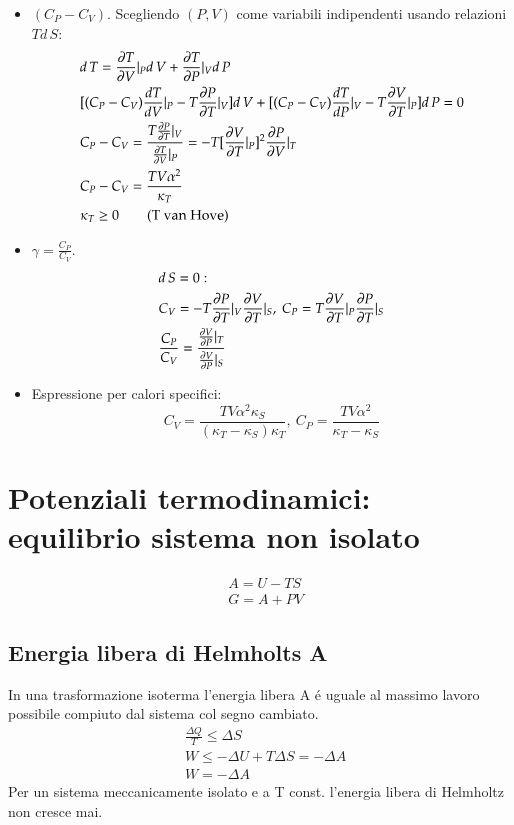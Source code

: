 \begin{itemize}
        \item $(C_P-C_V)$. Scegliendo $(P,V)$ come variabili indipendenti usando relazioni $Td\,S$:
        \begin{align*}
        &d\,T=\PDy{V}{T}|_Pd\,V+\PDy{P}{T}|_Vd\,P\\
        &[(C_P-C_V)\TDy{V}{T}|_P-T\PDy{T}{P}|_V]d\,V+[(C_P-C_V)\TDy{P}{T}|_V-T\PDy{T}{V}|_P]d\,P=0\\
        &C_P-C_V=\frac{T\PDy{T}{P}|_V}{\PDy{V}{T}|_P}=-T[\PDy{T}{V}|_P]^2\PDy{V}{P}|_T\\
        &C_P-C_V=\frac{TV\alpha^2}{\kappa_T}\\
        &\kappa_T\geq0\tag{T van Hove}
        \end{align*}
        \item $\gamma=\frac{C_P}{C_V}$.
        \begin{align*}
        &d\,S=0:\\
        &C_V=-T\PDy{T}{P}|_V\PDy{T}{V}|_S,\ C_P=T\PDy{T}{V}|_P\PDy{T}{P}|_S\\
        &\frac{C_P}{C_V}=\frac{\PDy{P}{V}|_T}{\PDy{P}{V}|_S}
        \end{align*}
        \item Espressione per calori specifici:
        \begin{equation*}
        C_V=\frac{TV\alpha^2\kappa_S}{(\kappa_T-\kappa_S)\kappa_T},\ C_P=\frac{TV\alpha^2}{\kappa_T-\kappa_S}
        \end{equation*}
        \end{itemize}
    \chapter{Potenziali termodinamici: equilibrio sistema non isolato}
        \begin{align}
        &A=U-TS\tag*{E libera di Helmholtz}\\
        &G=A+PV\tag*{E libera di Gibbs}
        \end{align}
        \section{Energia libera di Helmholts A}
            In una trasformazione isoterma l'energia libera A \'e uguale al massimo lavoro possibile compiuto dal sistema col segno cambiato.
            \begin{align*}
                &\frac{\Delta Q}{T}\leq\Delta S\\
                &W\leq-\Delta U+T\Delta S=-\Delta A\tag*{prima legge}\\
                &W=-\Delta A\tag*{reversibile}
            \end{align*}
            Per un sistema meccanicamente isolato e a T const. l'energia libera di Helmholtz non cresce mai.
